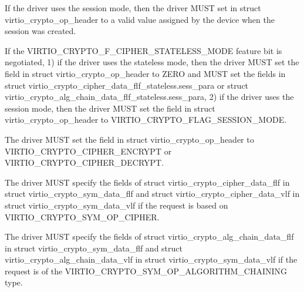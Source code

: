 \begin{itemize*}
\item If the driver uses the session mode, then the driver MUST set 
    in struct virtio_crypto_op_header to a valid value assigned by the device when the
    session was created.
\item If the VIRTIO_CRYPTO_F_CIPHER_STATELESS_MODE feature bit is negotiated, 1) if the
    driver uses the stateless mode, then the driver MUST set the  field in
    struct virtio_crypto_op_header to ZERO and MUST set the fields in struct
    virtio_crypto_cipher_data_flf_stateless.sess_para or struct
    virtio_crypto_alg_chain_data_flf_stateless.sess_para, 2) if the driver uses the
    session mode, then the driver MUST set the  field in struct
    virtio_crypto_op_header to VIRTIO_CRYPTO_FLAG_SESSION_MODE.
\item The driver MUST set the  field in struct virtio_crypto_op_header
    to VIRTIO_CRYPTO_CIPHER_ENCRYPT or VIRTIO_CRYPTO_CIPHER_DECRYPT.
\item The driver MUST specify the fields of struct virtio_crypto_cipher_data_flf in
    struct virtio_crypto_sym_data_flf and struct virtio_crypto_cipher_data_vlf in
    struct virtio_crypto_sym_data_vlf if the request is based on VIRTIO_CRYPTO_SYM_OP_CIPHER.
\item The driver MUST specify the fields of struct virtio_crypto_alg_chain_data_flf
    in struct virtio_crypto_sym_data_flf and struct virtio_crypto_alg_chain_data_vlf
    in struct virtio_crypto_sym_data_vlf if the request is of the VIRTIO_CRYPTO_SYM_OP_ALGORITHM_CHAINING
    type.
\end{itemize*}


